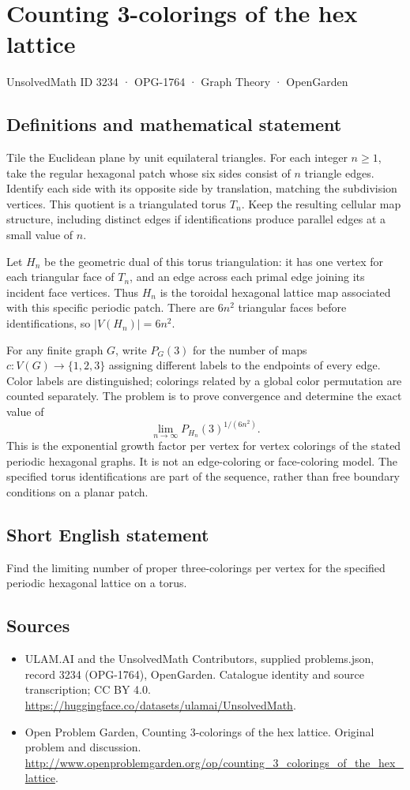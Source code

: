 \documentclass[11pt,a4paper]{article}
\begin{document}
\section*{Counting 3-colorings of the hex lattice}\label{3234}
{\small UnsolvedMath ID 3234 · OPG-1764 · Graph Theory · OpenGarden}
\subsection{Definitions and mathematical statement}
Tile the Euclidean plane by unit equilateral triangles. For each integer $n\ge1$, take the regular hexagonal patch whose six sides consist of $n$ triangle edges. Identify each side with its opposite side by translation, matching the subdivision vertices. This quotient is a triangulated torus $T_n$. Keep the resulting cellular map structure, including distinct edges if identifications produce parallel edges at a small value of $n$.

Let $H_n$ be the geometric dual of this torus triangulation: it has one vertex for each triangular face of $T_n$, and an edge across each primal edge joining its incident face vertices. Thus $H_n$ is the toroidal hexagonal lattice map associated with this specific periodic patch. There are $6n^2$ triangular faces before identifications, so $|V(H_n)|=6n^2$.

For any finite graph $G$, write $P_G(3)$ for the number of maps $c:V(G)\to\{1,2,3\}$ assigning different labels to the endpoints of every edge. Color labels are distinguished; colorings related by a global color permutation are counted separately. The problem is to prove convergence and determine the exact value of
\[
                \lim_{n\to\infty}P_{H_n}(3)^{1/(6n^2)}.
\]
This is the exponential growth factor per vertex for vertex colorings of the stated periodic hexagonal graphs. It is not an edge-coloring or face-coloring model. The specified torus identifications are part of the sequence, rather than free boundary conditions on a planar patch.
\subsection{Short English statement}
Find the limiting number of proper three-colorings per vertex for the specified periodic hexagonal lattice on a torus.
\subsection{Sources}
\begin{itemize}
\item[S1] ULAM.AI and the UnsolvedMath Contributors, supplied problems.json, record 3234 (OPG-1764), OpenGarden. Catalogue identity and source transcription; CC BY 4.0.
\url{https://huggingface.co/datasets/ulamai/UnsolvedMath}.
\item[S2] Open Problem Garden, Counting 3-colorings of the hex lattice. Original problem and discussion.
\url{http://www.openproblemgarden.org/op/counting_3_colorings_of_the_hex_lattice}.
\end{itemize}
\end{document}

